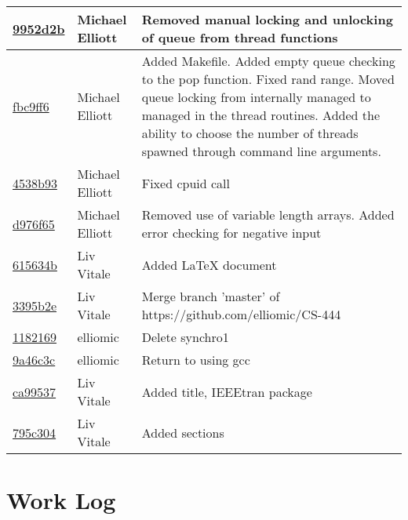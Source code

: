 \documentclass[letterpaper,10pt,titlepage,draftclsnofoot,onecolumn]{IEEEtran}
\begin{document}
\begin{tabular}{l l l}
\href{https://github.com/elliomic/CS-444/commit/9952d2b8061cbde3abc5e0b6fb4430c04aaa28e7}{9952d2b} & Michael Elliott & Removed manual locking and unlocking of queue from thread functions\\\hline
\href{https://github.com/elliomic/CS-444/commit/fbc9ff6fcc38d42815a70a9a0efff13171a768ac}{fbc9ff6} & Michael Elliott & Added Makefile. Added empty queue checking to the pop function. Fixed rand range. Moved queue locking from internally managed to managed in the thread routines. Added the ability to choose the number of threads spawned through command line arguments.\\\hline
\href{https://github.com/elliomic/CS-444/commit/4538b939bed2cc80ab0b8940c419877d51f693bc}{4538b93} & Michael Elliott & Fixed cpuid call\\\hline
\href{https://github.com/elliomic/CS-444/commit/d976f657bc72165f444aac68eeecfdda2d2e1afe}{d976f65} & Michael Elliott & Removed use of variable length arrays. Added error checking for negative input\\\hline
\href{https://github.com/elliomic/CS-444/commit/615634bdd2be122c6401c6c7ccf23e457ca09c84}{615634b} & Liv Vitale & Added LaTeX document\\\hline
\href{https://github.com/elliomic/CS-444/commit/3395b2e4d682283838e8cb97063e5517bb5b5d30}{3395b2e} & Liv Vitale & Merge branch 'master' of https://github.com/elliomic/CS-444\\\hline
\href{https://github.com/elliomic/CS-444/commit/1182169eca1f04759352581b206d7715f24499ca}{1182169} & elliomic & Delete synchro1\\\hline
\href{https://github.com/elliomic/CS-444/commit/9a46c3c9bab82e9618cddc3e1ddca4f4e3ae0765}{9a46c3c} & elliomic & Return to using gcc\\\hline
\href{https://github.com/elliomic/CS-444/commit/ca99537566dcc4c0aa6cac3e045d5fefad09dd46}{ca99537} & Liv Vitale & Added title, IEEEtran package\\\hline
\href{https://github.com/elliomic/CS-444/commit/795c3046ccb4c7bab06b6d779d74d179c68776d6}{795c304} & Liv Vitale & Added sections\\\hline\end{tabular}


\section{Work Log}


\nocite{*}



\end{document}
